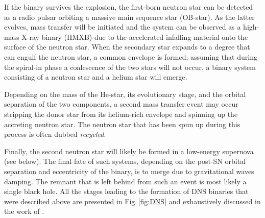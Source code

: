 \documentclass[../../main/thesis_msc.tex]{subfiles}
\begin{document}
				If the binary survives the explosion, the first-born neutron star can be detected as a radio pulsar orbiting a massive main sequence star (OB-star). As the latter evolves, mass transfer will be initiated and the system can be observed as a high-mass X-ray binary (HMXB) due to the accelerated infalling material onto the surface of the neutron star. When the secondary star expands to a degree that can engulf the neutron star, a common envelope is formed; assuming that during the spiral-in phase a coalescence of the two stars will not occur, a binary system consisting of a neutron star and a helium star will emerge.
				
				Depending on the mass of the He-star, its evolutionary stage, and the orbital separation of the two components, a second mass transfer event may occur stripping the donor star from its helium-rich envelope and spinning up the accreting neutron star. The neutron star that has been spun up during this process is often dubbed \emph{recycled}.
				
				Finally, the second neutron star will likely be formed in a low-energy supernova (see below). The final fate of such systems, depending on the post-SN orbital separation and eccentricity of the binary, is to merge due to gravitational waves damping. The remnant that is left behind from such an event is most likely a single black hole. All the stages leading to the formation of DNS binaries that were described above are presented in Fig.\,\ref{fig:DNS} and exhaustively discussed in the work of \cite{Tauris2017}.
				
\end{document}

